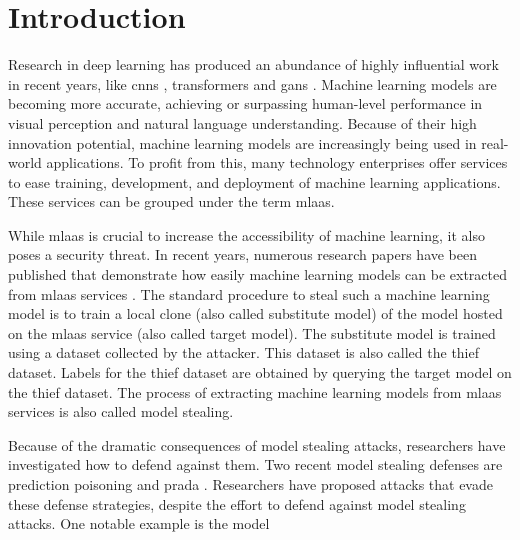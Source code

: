 
\chapter{Introduction}
\label{ch:Introduction}

Research in deep learning has produced an abundance of highly influential work in recent years, like
\glspl{cnn} \cite{lecun1998gradient}, transformers \cite{vaswani2017attention} and \glspl{gan} \cite{goodfellow2020generative}.
Machine learning models are becoming more accurate, achieving or surpassing human-level performance in visual
perception and natural language understanding. Because of their high innovation potential, machine learning models are increasingly
being used in real-world applications. To profit from this, many technology
enterprises offer services to ease training, development, and deployment of machine learning applications. These services can
be grouped under the term \gls{mlaas}. \par
While \gls{mlaas} is crucial to increase the accessibility of machine learning, it also poses a security threat. In recent years, numerous research papers
have been published that demonstrate how easily machine learning models can be extracted from \gls{mlaas} services \parencite{papernot2017practical,tramer2016stealing,
reith2019efficiently}. The standard procedure to steal such a machine learning model is to train a local
clone (also called substitute model) of the model hosted on the \gls{mlaas} service (also called target model). The substitute model is trained
using a dataset collected by the attacker. This dataset is also called the thief dataset. Labels for the thief dataset are obtained by querying the target
model on the thief dataset. The process of extracting machine learning models from \gls{mlaas} services is also called model stealing. \par
Because of the dramatic consequences of model stealing attacks, researchers have investigated how to defend against them. Two recent model stealing
defenses are prediction poisoning \cite{orekondy2019prediction} and \gls{prada} \cite{juuti2019prada}. Researchers have proposed attacks that evade
these defense strategies, despite the effort to
defend against model stealing attacks. One notable example is the model
